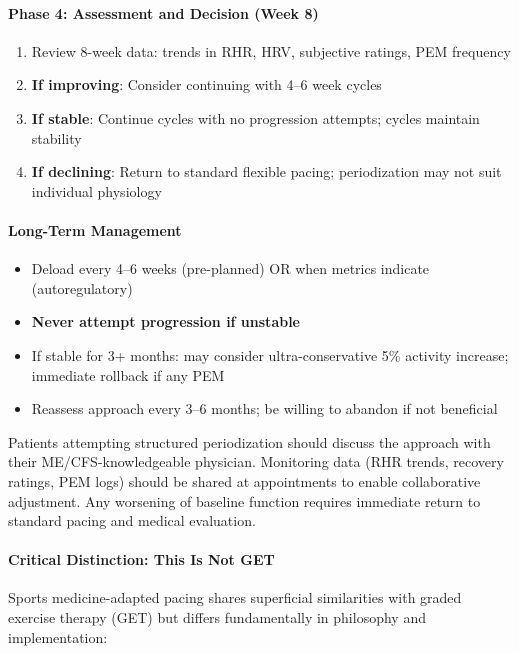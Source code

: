 \paragraph{Phase 4: Assessment and Decision (Week 8)}
\begin{enumerate}
    \item Review 8-week data: trends in RHR, HRV, subjective ratings, PEM frequency
    \item \textbf{If improving}: Consider continuing with 4--6 week cycles
    \item \textbf{If stable}: Continue cycles with no progression attempts; cycles maintain stability
    \item \textbf{If declining}: Return to standard flexible pacing; periodization may not suit individual physiology
\end{enumerate}

\paragraph{Long-Term Management}
\begin{itemize}
    \item Deload every 4--6 weeks (pre-planned) OR when metrics indicate (autoregulatory)
    \item \textbf{Never attempt progression if unstable}
    \item If stable for 3+ months: may consider ultra-conservative 5\% activity increase; immediate rollback if any PEM
    \item Reassess approach every 3--6 months; be willing to abandon if not beneficial
\end{itemize}

\begin{recommendation}
Patients attempting structured periodization should discuss the approach with their ME/CFS-knowledgeable physician. Monitoring data (RHR trends, recovery ratings, PEM logs) should be shared at appointments to enable collaborative adjustment. Any worsening of baseline function requires immediate return to standard pacing and medical evaluation.
\end{recommendation}

\paragraph{Critical Distinction: This Is Not GET}

Sports medicine-adapted pacing shares superficial similarities with graded exercise therapy (GET) but differs fundamentally in philosophy and implementation:

